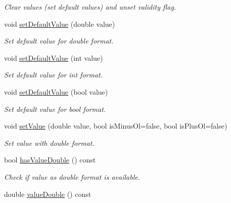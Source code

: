 \begin{DoxyCompactItemize}
\begin{DoxyCompactList}\small\item\em Clear values (set default values) and unset validity flag. \end{DoxyCompactList}\item 
void \hyperlink{classmdt_value_a51d075b0cc64ff5481533bcfc8d3a7f4}{setDefaultValue} (double value)
\begin{DoxyCompactList}\small\item\em Set default value for double format. \end{DoxyCompactList}\item 
void \hyperlink{classmdt_value_aad4a2fb80d76fc2924ea1a72ce529167}{setDefaultValue} (int value)
\begin{DoxyCompactList}\small\item\em Set default value for int format. \end{DoxyCompactList}\item 
void \hyperlink{classmdt_value_a82ecd7744702a5e152404c1b05b1a69d}{setDefaultValue} (bool value)
\begin{DoxyCompactList}\small\item\em Set default value for bool format. \end{DoxyCompactList}\item 
void \hyperlink{classmdt_value_aa4573c55ea1cc6c55547b09db8c9d521}{setValue} (double value, bool isMinusOl=false, bool isPlusOl=false)
\begin{DoxyCompactList}\small\item\em Set value with double format. \end{DoxyCompactList}\item 
\hypertarget{classmdt_value_a83d56329f2fd051f3cc32fd32f758e24}{
bool \hyperlink{classmdt_value_a83d56329f2fd051f3cc32fd32f758e24}{hasValueDouble} () const }
\label{classmdt_value_a83d56329f2fd051f3cc32fd32f758e24}

\begin{DoxyCompactList}\small\item\em Check if value as double format is available. \end{DoxyCompactList}\item 
\hypertarget{classmdt_value_aceae9e2ab20910c47272d523735b16e0}{
double \hyperlink{classmdt_value_aceae9e2ab20910c47272d523735b16e0}{valueDouble} () const }
\label{classmdt_value_aceae9e2ab20910c47272d523735b16e0}


\end{DoxyCompactItemize}
